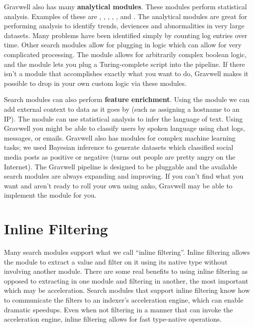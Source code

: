 Gravwell also has many \textbf{analytical modules}. These modules perform
statistical analysis. Examples of these are , ,
, , , and . The analytical
modules are great for performing analysis to identify
trends, deviences and abnormalities in very large datasets. Many
problems have been identified simply by counting log entries over time.
Other search modules allow for plugging in logic which can allow for
very complicated processing. The  module allows for arbitrarily
complex boolean logic, and the  module lets you plug a
Turing-complete script into the pipeline. If there isn't a module that
accomplishes exactly what you want to do, Gravwell makes it possible to
drop in your own custom logic via these modules.

Search modules can also perform \textbf{feature enrichment}. Using the
 module we can add external context to data as it goes by
(such as assigning a hostname to an IP). The  module can
use statistical analysis to infer the language of text. Using Gravwell
you might be able to classify users by spoken language using chat logs,
messages, or emails. Gravwell also has modules for complex machine
learning tasks; we used Bayesian inference to generate datasets which
classified social media posts as positive or negative (turns out people
are pretty angry on the Internet). The Gravwell pipeline is designed to
be pluggable and the available search modules are always expanding and
improving. If you can't find what you want and aren't ready to roll
your own using anko, Gravwell may be able to implement the module for you.


\section{Inline Filtering}
Many search modules support what we call ``inline filtering''. Inline
filtering allows the module to extract a value and filter on it using
its native type without involving another module. There are some real
benefits to using inline filtering as opposed to extracting in one
module and filtering in another, the most important which may be
acceleration. Search modules that support inline filtering know how to
communicate the filters to an indexer's acceleration engine, which can
enable dramatic speedups. Even when not filtering in a manner that can
invoke the acceleration engine, inline filtering allows for fast type-native operations.

